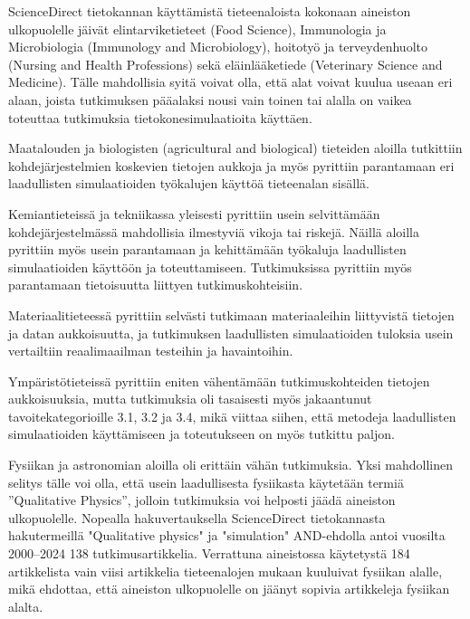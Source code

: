 \documentclass[utf8]{gradu3}
\begin{document}
ScienceDirect tietokannan käyttämistä tieteenaloista kokonaan aineiston ulkopuolelle jäivät
elintarviketieteet (Food Science), Immunologia ja Microbiologia (Immunology and Microbiology),
hoitotyö ja terveydenhuolto (Nursing and Health Professions) 
sekä eläinlääketiede (Veterinary Science and Medicine). 
Tälle mahdollisia syitä voivat olla, 
että alat voivat kuulua useaan eri alaan, joista tutkimuksen 
pääalaksi nousi vain toinen tai alalla 
on vaikea toteuttaa tutkimuksia tietokonesimulaatioita käyttäen.

Maatalouden ja biologisten (agricultural and biological) tieteiden aloilla
tutkittiin kohdejärjestelmien koskevien tietojen aukkoja ja myös pyrittiin
parantamaan eri laadullisten simulaatioiden työkalujen käyttöä tieteenalan
sisällä.

Kemiantieteissä ja tekniikassa yleisesti 
pyrittiin usein selvittämään kohdejärjestelmässä mahdollisia 
ilmestyviä vikoja tai riskejä.
Näillä aloilla pyrittiin myös usein parantamaan ja 
kehittämään työkaluja laadullisten simulaatioiden käyttöön ja toteuttamiseen.
Tutkimuksissa pyrittiin myös parantamaan tietoisuutta liittyen tutkimuskohteisiin.

Materiaalitieteessä pyrittiin selvästi 
tutkimaan materiaaleihin liittyvistä tietojen ja datan aukkoisuutta, 
ja tutkimuksen laadullisten simulaatioiden tuloksia usein vertailtiin reaalimaailman testeihin ja havaintoihin.

Ympäristötieteissä pyrittiin eniten vähentämään tutkimuskohteiden tietojen aukkoisuuksia, mutta tutkimuksia oli tasaisesti myös jakaantunut tavoitekategorioille 3.1, 3.2 ja 3.4, mikä viittaa siihen, että
metodeja laadullisten simulaatioiden käyttämiseen ja toteutukseen on myös
tutkittu paljon.

Fysiikan ja astronomian aloilla oli erittäin vähän tutkimuksia.
Yksi mahdollinen selitys tälle voi olla,
että usein laadullisesta fysiikasta käytetään termiä ''Qualitative Physics'', jolloin tutkimuksia voi helposti jäädä aineiston ulkopuolelle. Nopealla hakuvertauksella
ScienceDirect tietokannasta hakutermeillä "Qualitative physics" ja "simulation" AND-ehdolla
antoi vuosilta 2000–2024 138 tutkimusartikkelia. 
Verrattuna aineistossa käytetystä 184 artikkelista 
vain viisi artikkelia tieteenalojen mukaan kuuluivat fysiikan alalle,
mikä ehdottaa, että aineiston ulkopuolelle on jäänyt sopivia artikkeleja fysiikan alalta.
\end{document}
